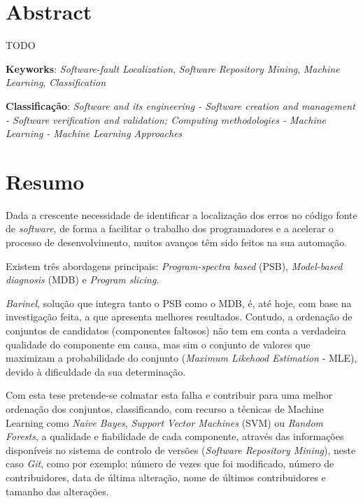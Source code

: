 \chapter*{Abstract}

TODO

\vspace*{10mm}\noindent

\textbf{Keyworks}: \emph{Software-fault Localization}, \emph{Software Repository Mining}, \emph{Machine Learning}, \emph{Classification}

\vspace*{5mm}\noindent

\textbf{Classificação}: \emph{Software and its engineering - Software creation and management - Software verification and validation; Computing methodologies - Machine Learning - Machine Learning Approaches}

\chapter*{Resumo}

Dada a crescente necessidade de identificar a localização dos erros no código fonte de \emph{software}, de forma a facilitar o trabalho dos programadores e a acelerar o processo de desenvolvimento, muitos avanços têm sido feitos na sua automação.

Existem três abordagens principais: \emph{Program-spectra based} (PSB), \emph{Model-based diagnosis} (MDB) e \emph{Program slicing}.

\emph{Barinel}, solução que integra tanto o PSB como o MDB, é, até hoje, com base na investigação feita, a que apresenta melhores resultados. Contudo, a ordenação de conjuntos de candidatos (componentes faltosos) não tem em conta a verdadeira qualidade do componente em causa, mas sim o conjunto de valores que maximizam a probabilidade do conjunto (\emph{Maximum Likehood Estimation} - MLE), devido à dificuldade da sua determinação.

Com esta tese pretende-se colmatar esta falha e contribuir para uma melhor ordenação dos conjuntos, classificando, com recurso a técnicas de Machine Learning como \emph{Naive Bayes}, \emph{Support Vector Machines} (SVM) ou \emph{Random Forests}, a qualidade e fiabilidade de cada componente, através das informações disponíveis no sistema de controlo de versões (\emph{Software Repository Mining}), neste caso \emph{Git}, como por exemplo: número de vezes que foi modificado, número de contribuidores, data de última alteração, nome de últimos contribuidores e tamanho das alterações.

